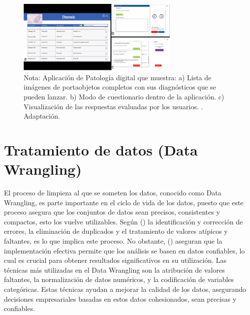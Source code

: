 \documentclass[letter,oneside,12pt,spanish]{report}
\begin{document}
\begin{figure}[ht]
    \centering
    \includegraphics[width=0.7\textwidth]{Figs/mcgill university aplication.png}
    \label{fig:McGuillAPP}
    \\Nota: Aplicación de Patología digital que muestra: a) Lista de imágenes de portaobjetos completos con sus diagnósticos   que se pueden lanzar. b) Modo de cuestionario dentro de la aplicación. c) Visualización de las respuestas evaluadas por los usuarios. \cite{rajaram2022pathology}. Adaptación.
\end{figure}



\section{Tratamiento de datos (Data Wrangling)}

\noindent El proceso de limpieza al que se someten los datos, conocido como Data Wrangling, es parte importante en el ciclo de vida de los datos, puesto que este proceso asegura que los conjuntos de datos sean precisos, consistentes y compactos, esto los vuelve utilizables. Según (\cite{rattenbury2017principles}) la identificación y corrección de errores, la eliminación de duplicados y el tratamiento de valores atípicos y faltantes, es lo que implica este proceso. No obstante, (\cite{kazil2016data}) aseguran que la implementación efectiva permite que los análisis se basen en datos confiables, lo cual es crucial para obtener resultados significativos en su utilización. Las técnicas más utilizadas en el Data Wrangling son la atribución de valores faltantes, la normalización de datos numéricos, y la codificación de variables categóricas. Estas técnicas ayudan a mejorar la calidad de los datos, asegurando decisiones empresariales basadas en estos datos cohesionados, sean precisas y confiables.
\end{document}
